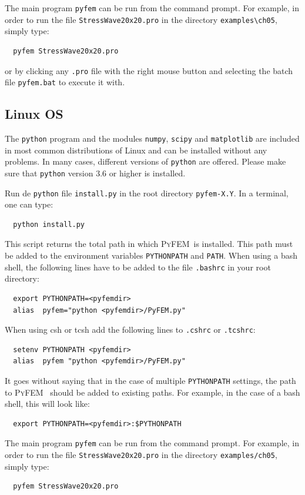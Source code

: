 \documentclass{article}
\newcommand{\progname}{\textsc{PyFEM}}
\begin{document}
\begin{enumerate}
The main program \texttt{pyfem} can be run from the command prompt. For example, in order to run the
file \texttt{StressWave20x20.pro} in the directory \texttt{examples\textbackslash ch05}, simply type:
\begin{verbatim}
  pyfem StressWave20x20.pro
\end{verbatim}
or by clicking any \texttt{.pro} file with the right mouse button and selecting the batch file \texttt{pyfem.bat} 
to execute it with.
\end{enumerate}

\subsection{Linux OS}

The \texttt{python} program and the modules \texttt{numpy}, \texttt{scipy} and \texttt{matplotlib}
are included in most common distributions of Linux and can be installed without any problems. In many
cases, different versions of \texttt{python} are offered. Please make sure that \texttt{python} version 3.6 or higher is
installed.

\noindent Run de \texttt{python} file \texttt{install.py} in the root directory 
\texttt{pyfem-X.Y}. In a terminal, one can type:
\begin{verbatim}
  python install.py
\end{verbatim}
This script returns the total path in which \progname~is installed. This path must be 
added to the environment variables \texttt{PYTHONPATH} and \texttt{PATH}. When using a bash shell, 
the following lines have to be added to the file \texttt{.bashrc} in your root directory:
\begin{verbatim}
  export PYTHONPATH=<pyfemdir>
  alias  pyfem="python <pyfemdir>/PyFEM.py"
\end{verbatim}
When using csh or tcsh add the following lines to \texttt{.cshrc} or \texttt{.tcshrc}:
\begin{verbatim}
  setenv PYTHONPATH <pyfemdir>
  alias  pyfem "python <pyfemdir>/PyFEM.py"
\end{verbatim}
It goes without saying that in the case of multiple \texttt{PYTHONPATH} settings, the path to \progname~ 
should be added to existing paths. For example, in the case of a bash shell, this will look like:
\begin{verbatim}
  export PYTHONPATH=<pyfemdir>:$PYTHONPATH
\end{verbatim}
The main program \texttt{pyfem} can be run from the command prompt. For example, in order to run the
file \texttt{StressWave20x20.pro} in the directory \texttt{examples/ch05}, simply type:
\begin{verbatim}
  pyfem StressWave20x20.pro
\end{verbatim}
\end{document}
